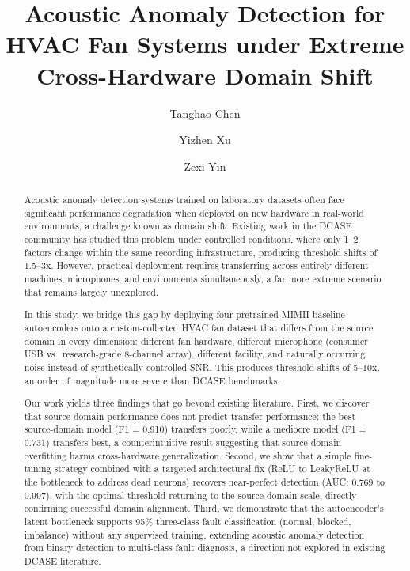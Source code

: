 \documentclass[sigconf]{acmart}
\begin{document}
\title{Acoustic Anomaly Detection for HVAC Fan Systems under Extreme Cross-Hardware Domain Shift}

\author{Tanghao Chen}

\author{Yizhen Xu}

\author{Zexi Yin}

\begin{abstract}
Acoustic anomaly detection systems trained on laboratory datasets often face significant performance degradation when deployed on new hardware in real-world environments, a challenge known as domain shift. Existing work in the DCASE community has studied this problem under controlled conditions, where only 1--2 factors change within the same recording infrastructure, producing threshold shifts of 1.5--3x. However, practical deployment requires transferring across entirely different machines, microphones, and environments simultaneously, a far more extreme scenario that remains largely unexplored.

In this study, we bridge this gap by deploying four pretrained MIMII baseline autoencoders onto a custom-collected HVAC fan dataset that differs from the source domain in every dimension: different fan hardware, different microphone (consumer USB vs.\ research-grade 8-channel array), different facility, and naturally occurring noise instead of synthetically controlled SNR. This produces threshold shifts of 5--10x, an order of magnitude more severe than DCASE benchmarks.

Our work yields three findings that go beyond existing literature. First, we discover that source-domain performance does not predict transfer performance: the best source-domain model (F1 = 0.910) transfers poorly, while a mediocre model (F1 = 0.731) transfers best, a counterintuitive result suggesting that source-domain overfitting harms cross-hardware generalization. Second, we show that a simple fine-tuning strategy combined with a targeted architectural fix (ReLU to LeakyReLU at the bottleneck to address dead neurons) recovers near-perfect detection (AUC: 0.769 to 0.997), with the optimal threshold returning to the source-domain scale, directly confirming successful domain alignment. Third, we demonstrate that the autoencoder's latent bottleneck supports 95\% three-class fault classification (normal, blocked, imbalance) without any supervised training, extending acoustic anomaly detection from binary detection to multi-class fault diagnosis, a direction not explored in existing DCASE literature.
\end{abstract}
\end{document}
